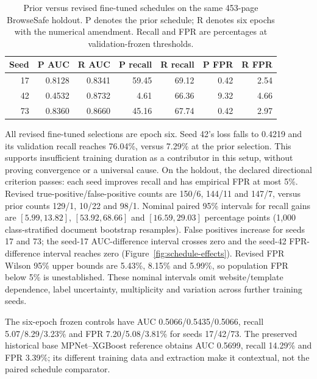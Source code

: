 \documentclass[11pt, a4paper]{article}
\begin{document}
\begin{table}[htbp]
\centering
\small
\caption{Prior versus revised fine-tuned schedules on the same 453-page
BrowseSafe holdout. P denotes the prior schedule; R denotes six epochs
with the numerical amendment. Recall and FPR are percentages at
validation-frozen thresholds.}
\begin{tabular}{rrrrrrr}
\toprule
Seed & P AUC & R AUC & P recall & R recall & P FPR & R FPR \\
\midrule
17 & 0.8128 & 0.8341 & 59.45 & 69.12 & 0.42 & 2.54 \\
42 & 0.4532 & 0.8732 & 4.61 & 66.36 & 9.32 & 4.66 \\
73 & 0.8360 & 0.8660 & 45.16 & 67.74 & 0.42 & 2.97 \\
\bottomrule
\end{tabular}
\label{tab:supervised-schedule}
\end{table}

All revised fine-tuned selections are epoch six. Seed 42's loss falls
to 0.4219 and its validation recall reaches 76.04\%, versus 7.29\%
at the prior selection. This supports insufficient training duration as
a contributor in this setup, without proving convergence or a universal
cause. On the holdout, the declared directional criterion passes:
each seed improves recall and has empirical FPR at most 5\%.
Revised true-positive/false-positive counts are 150/6, 144/11 and 147/7,
versus prior counts 129/1, 10/22 and 98/1. Nominal paired 95\% intervals
for recall gains are $[5.99,13.82]$, $[53.92,68.66]$ and
$[16.59,29.03]$ percentage points (1,000 class-stratified document
bootstrap resamples). False positives increase for seeds 17 and 73;
the seed-17 AUC-difference interval crosses zero and the seed-42
FPR-difference interval reaches zero (Figure~\ref{fig:schedule-effects}).
Revised FPR Wilson 95\% upper bounds are 5.43\%, 8.15\% and 5.99\%,
so population FPR below 5\% is unestablished. These nominal intervals
omit website/template dependence, label uncertainty, multiplicity and
variation across further training seeds.

The six-epoch frozen controls have AUC 0.5066/0.5435/0.5066, recall
5.07/8.29/3.23\% and FPR 7.20/5.08/3.81\% for seeds 17/42/73.
The preserved historical base MPNet--XGBoost reference obtains AUC
0.5699, recall 14.29\% and FPR 3.39\%; its different training data
and extraction make it contextual, not the paired schedule comparator.
\end{document}
